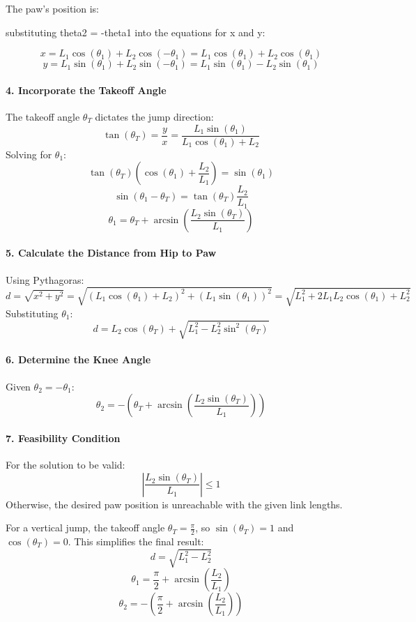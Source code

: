 The paw's position is:

substituting theta2 = -theta1 into the equations for x and y:   

\[
x = L_1 \cos(\theta_1) + L_2 \cos(-\theta_1) = L_1 \cos(\theta_1) + L_2 \cos(\theta_1)
\]
\[
y = L_1 \sin(\theta_1) + L_2 \sin(-\theta_1) = L_1 \sin(\theta_1) - L_2 \sin(\theta_1)
\]



\paragraph{4. Incorporate the Takeoff Angle}

The takeoff angle \( \theta_T \) dictates the jump direction:
\[
\tan(\theta_T) = \frac{y}{x} = \frac{L_1 \sin(\theta_1)}{L_1 \cos(\theta_1) + L_2}
\]
Solving for \( \theta_1 \):
\[
\tan(\theta_T) (\cos(\theta_1) + \frac{L_2}{L_1}) = \sin(\theta_1)
\]
\[
\sin(\theta_1 - \theta_T) = \tan(\theta_T) \frac{L_2}{L_1}
\]
\[
\theta_1 = \theta_T + \arcsin\left(\frac{L_2 \sin(\theta_T)}{L_1}\right)
\]

\paragraph{5. Calculate the Distance from Hip to Paw}

Using Pythagoras:
\[
d = \sqrt{x^2 + y^2} = \sqrt{(L_1 \cos(\theta_1) + L_2)^2 + (L_1 \sin(\theta_1))^2} = \sqrt{L_1^2 + 2 L_1 L_2 \cos(\theta_1) + L_2^2}
\]
Substituting \( \theta_1 \):
\[
d = L_2 \cos(\theta_T) + \sqrt{L_1^2 - L_2^2 \sin^2(\theta_T)}
\]

\paragraph{6. Determine the Knee Angle}

Given \( \theta_2 = -\theta_1 \):
\[
\theta_2 = -\left( \theta_T + \arcsin\left(\frac{L_2 \sin(\theta_T)}{L_1}\right) \right)
\]

\paragraph{7. Feasibility Condition}

For the solution to be valid:
\[
\left| \frac{L_2 \sin(\theta_T)}{L_1} \right| \leq 1
\]
Otherwise, the desired paw position is unreachable with the given link lengths.

For a vertical jump, the takeoff angle \( \theta_T = \frac{\pi}{2} \), so \( \sin(\theta_T) = 1 \) and \( \cos(\theta_T) = 0 \). This simplifies the final result:
\[
d = \sqrt{L_1^2 - L_2^2}
\]
\[
\theta_1 = \frac{\pi}{2} + \arcsin\left(\frac{L_2}{L_1}\right)
\]
\[
\theta_2 = -\left( \frac{\pi}{2} + \arcsin\left(\frac{L_2}{L_1}\right) \right)
\]

